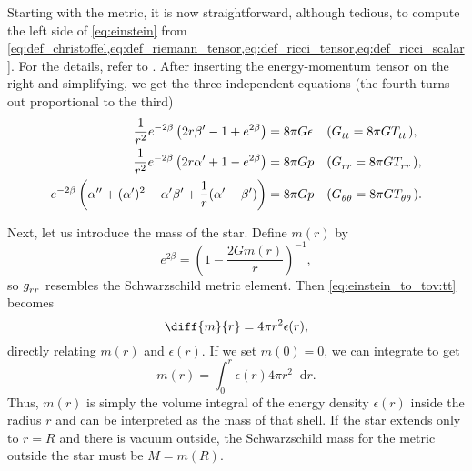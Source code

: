 \documentclass[a4paper,11pt,twoside]{report}
\newcommand\dif{\mathop{}\!\mathrm{d}}
\begin{document}
Starting with the metric, it is now straightforward, although tedious, to compute the left side of \cref{eq:einstein} from \cref{eq:def_christoffel,eq:def_riemann_tensor,eq:def_ricci_tensor,eq:def_ricci_scalar}.
For the details, refer to \cite{ref:carroll}.
After inserting the energy-momentum tensor on the right and simplifying, we get the three independent equations
(the fourth turns out proportional to the third)
\begin{subequations}
\begin{align}
	\frac{1}{r^2} e^{-2 \beta} \left( 2 r \beta' - 1 + e^{2 \beta} \right)  &= 8 \pi G \epsilon
	&& (G\indices{_t_t} = 8 \pi G T\indices{_t_t})                     , \label{eq:einstein_to_tov:tt} \\
	\frac{1}{r^2} e^{-2 \beta} \left( 2 r \alpha' + 1 - e^{2 \beta} \right) &= 8 \pi G p
	&& (G\indices{_r_r} = 8 \pi G T\indices{_r_r})                     , \label{eq:einstein_to_tov:rr} \\
	e^{-2 \beta} \left( \alpha'' + (\alpha')^2 - \alpha' \beta' + \frac{1}{r} (\alpha' - \beta') \right) &= 8 \pi G p
	&& (G\indices{_\theta_\theta} = 8 \pi G T\indices{_\theta_\theta}) . \label{eq:einstein_to_tov:thetatheta}
\end{align}
\end{subequations}

Next, let us introduce the mass of the star.
Define $m(r)$ by
\begin{equation}
	e^{2 \beta} = \left( 1 - \frac{2 G m(r)}{r} \right)^{-1} ,
	\label{eq:einstein_to_tov:def_m}
\end{equation}
so $g\indices{_r_r}$ resembles the Schwarzschild metric element.
Then \cref{eq:einstein_to_tov:tt} becomes
\begin{equation}
	\diff{m}{r} = 4 \pi r^2 \epsilon(r) ,
	\label{eq:einstein_to_tov:m_rho}
\end{equation}
directly relating $m(r)$ and $\epsilon(r)$.
If we set $m(0) = 0$, we can integrate to get
\begin{equation}
	m(r) = \int_0^r \epsilon(r) 4 \pi r^2 \dif r .
\end{equation}
Thus, $m(r)$ is simply the volume integral of the energy density $\epsilon(r)$ inside the radius $r$ and can be interpreted as the mass of that shell.
If the star extends only to $r = R$ and there is vacuum outside, the Schwarzschild mass for the metric outside the star must be $M = m(R)$.
\end{document}
